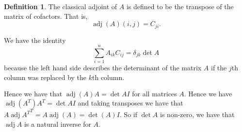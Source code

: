 \documentclass[12pt]{article}
\theoremstyle{plain}
\theoremstyle{definition}
\newtheorem{defn}{Definition}
\newcommand{\adj}{\operatorname{adj}}
\begin{document}
\begin{defn}
The classical adjoint of $A$ is defined to be the transpose of the matrix of cofactors. That is,
\[ \adj(A)(i, j) = C_{ji}.\]
\end{defn}

We have the identity 
\[\sum_{i = 1}^nA_{ik}C_{ij} = \delta_{jk}\det{A} \]
because the left hand side describes the determinant of the matrix $A$ if the $j$th column was replaced by the $k$th column.

Hence we have that $\adj(A)A = \det{A}I$ for all matrices $A$. Hence we have $\adj(A^T)A^T = \det{A}I$ and taking transposes we have that $A\adj{A^T}^T = A\adj(A)= \det(A)I$. So if $\det{A}$ is non-zero, we have that $\adj{A}$ is a natural inverse for $A$. 
\end{document}
